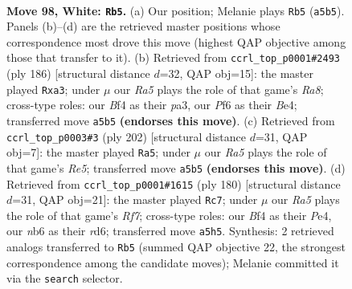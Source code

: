 \documentclass[11pt]{article}
\begin{document}
\clearpage

\begin{figure}[p]\centering
\begin{subfigure}{0.46\textwidth}\centering
\resizebox{\linewidth}{!}{%
\newchessgame
\chessboard[
  setfen={6k1/1r6/1n3P1P/R7/p4B2/P7/6K1/8 w - - 5 98},
  showmover=false,
  pgfstyle=straightmove, color=movearrow, markmove={a5-b5}
]}
\caption{}
\end{subfigure}\hfill
\begin{subfigure}{0.46\textwidth}\centering
\resizebox{\linewidth}{!}{%
\newchessgame
\chessboard[
  setfen={R3b3/4k1r1/4P2p/8/4B2P/p7/4K3/8 w - - 3 94},
  showmover=false,
  pgfstyle=straightmove, color=movearrow, markmove={a8-a3}
]}
\caption{}
\end{subfigure}
\\[4pt]
\begin{subfigure}{0.46\textwidth}\centering
\resizebox{\linewidth}{!}{%
\newchessgame
\chessboard[
  setfen={8/8/6k1/4R2p/7P/2r5/6PK/8 w - - 13 102},
  showmover=false,
  pgfstyle=straightmove, color=movearrow, markmove={e5-a5}
]}
\caption{}
\end{subfigure}\hfill
\begin{subfigure}{0.46\textwidth}\centering
\resizebox{\linewidth}{!}{%
\newchessgame
\chessboard[
  setfen={8/5R2/3r1p1k/5P2/4P3/4K3/8/8 w - - 17 91},
  showmover=false,
  pgfstyle=straightmove, color=movearrow, markmove={f7-c7}
]}
\caption{}
\end{subfigure}
\caption{\textbf{Move 98, White: \texttt{Rb5}.} (a) Our position; Melanie plays \texttt{Rb5} (\texttt{a5b5}). Panels (b)--(d) are the retrieved master positions whose correspondence most drove this move (highest QAP objective among those that transfer to it). (b) Retrieved from \texttt{ccrl\_top\_p0001\#2493} (ply 186) [structural distance $d$=32, QAP obj=15]: the master played \texttt{Rxa3}; under $\mu$ our \emph{Ra5} plays the role of that game's \emph{Ra8}; cross-type roles: our \emph{B}f4 as their \emph{p}a3, our \emph{P}f6 as their \emph{B}e4; transferred move \texttt{a5b5} \textbf{(endorses this move)}. (c) Retrieved from \texttt{ccrl\_top\_p0003\#3} (ply 202) [structural distance $d$=31, QAP obj=7]: the master played \texttt{Ra5}; under $\mu$ our \emph{Ra5} plays the role of that game's \emph{Re5}; transferred move \texttt{a5b5} \textbf{(endorses this move)}. (d) Retrieved from \texttt{ccrl\_top\_p0001\#1615} (ply 180) [structural distance $d$=31, QAP obj=21]: the master played \texttt{Rc7}; under $\mu$ our \emph{Ra5} plays the role of that game's \emph{Rf7}; cross-type roles: our \emph{B}f4 as their \emph{P}e4, our \emph{n}b6 as their \emph{r}d6; transferred move \texttt{a5h5}. Synthesis: 2 retrieved analogs transferred to \texttt{Rb5} (summed QAP objective 22, the strongest correspondence among the candidate moves); Melanie committed it via the \texttt{search} selector.}
\label{fig:thought-m194}
\end{figure}
\end{document}
